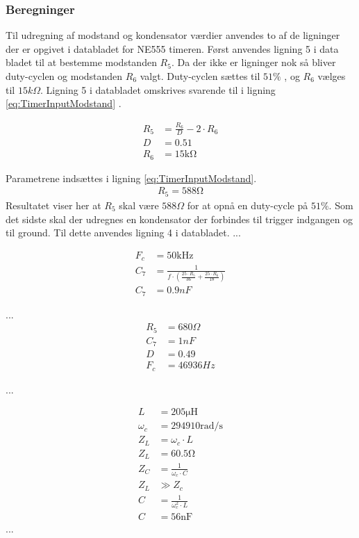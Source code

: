 \subsubsection{Beregninger}
Til udregning af modstand og kondensator værdier anvendes to af de ligninger der er opgivet i databladet for NE555 timeren. 
Først anvendes ligning 5 i data bladet til at bestemme modstanden $R_5$. 
Da der ikke er ligninger nok så bliver duty-cyclen og modstanden $R_6$ valgt. 
Duty-cyclen sættes til $51 \% $ , og $R_6$ vælges til $15k \Omega $. 
Ligning 5 i databladet omskrives svarende til i ligning \ref{eq:TimerInputModstand} .

\begin{align}
R_5 & = \frac{R_6}{D} - 2 \cdot R_6 \label{eq:TimerInputModstand} \\
D & = 0.51 \nonumber \\
R_6 & = 15 \si{\kilo \ohm} \nonumber
\end{align}

Parametrene indsættes i ligning \ref{eq:TimerInputModstand}.
\begin{align}
R_5 = 588 \si{\ohm} \label{eq:InputBeregnet}
\end{align}
Resultatet viser her at $R_5$ skal være $588 \Omega $ for at opnå en duty-cycle på $51 \% $.
Som det sidste skal der udregnes en kondensator der forbindes til trigger indgangen og til ground. 
Til dette anvendes ligning 4 i databladet. 
... 

\begin{align}
F_c & = 50 \si{\kilo \hertz} \\
C_7 & = \frac{1}{f \cdot \left( \frac{25 \cdot R_5 }{36} + \frac{25 \cdot R_6}{18} \right) } \\
C_7 & = 0.9nF
\end{align}

...
\begin{align}
R_5 & = 680 \Omega \\
C_7 & = 1nF \\
D & = 0.49 \\
F_c & = 46936Hz
\end{align}

...

\begin{align}
	L & = 205 \si{\micro \henry} \nonumber  \\
	\omega_c & = 294910 \si{\radian\per\second} \nonumber \\
	Z_L & = \omega_c \cdot L \\
	Z_L & = 60.5 \si{\ohm} \\
	Z_C & = \frac{1}{\omega_c \cdot C} \\
	Z_L & \gg Z_c \\
	C & = \frac{1}{\omega_c ^2 \cdot L}	\\
	C & = 56 \si{\nano\farad}
	\end{align}
...


